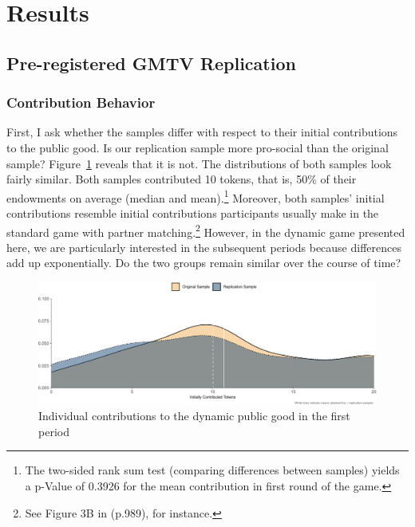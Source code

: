 \documentclass[
  authoryear,
  preprint,
  3p]{elsarticle}
\begin{document}
\hypertarget{sec-results}{%
\section{Results}\label{sec-results}}

\hypertarget{sec-replication}{%
\subsection{Pre-registered GMTV Replication}\label{sec-replication}}

\hypertarget{sec-contributions}{%
\subsubsection{Contribution Behavior}\label{sec-contributions}}

First, I ask whether the samples differ with respect to their initial
contributions to the public good. Is our replication sample more
pro-social than the original sample? Figure~\ref{fig-first-round}
reveals that it is not. The distributions of both samples look fairly
similar. Both samples contributed 10 tokens, that is, 50\% of their
endowments on average (median and mean).\footnote{The two-sided rank sum
  test (comparing differences between samples) yields a p-Value of
  0.3926 for the mean contribution in first round of the game.}
Moreover, both samples' initial contributions resemble initial
contributions participants usually make in the standard game with
partner matching.\footnote{See Figure 3B in \citet{fehrgaechter2000}
  (p.989), for instance.} However, in the dynamic game presented here,
we are particularly interested in the subsequent periods because
differences add up exponentially. Do the two groups remain similar over
the course of time?

\begin{figure}

{\centering \includegraphics{paper_files/figure-pdf/fig-first-round-1.pdf}

}

\caption{\label{fig-first-round}Individual contributions to the dynamic
public good in the first period}

\end{figure}
\end{document}
